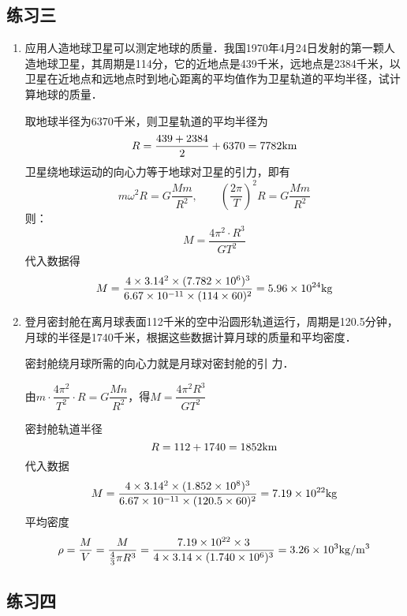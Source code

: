 \subsection{练习三}
\begin{enumerate}
	\item 应用人造地球卫星可以测定地球的质量．我国1970年4月24日发射的第一颗人造地球卫星，其周期是114分，它的近地点是439千米，远地点是2384千米，以卫星在近地点和远地点时到地心距离的平均值作为卫星轨道的平均半径，试计算地球的质量．

	\begin{solution}
		取地球半径为6370千米，则卫星轨道的平均半径为		
	\[R=\frac{439+2384}{2}+6370=7782{\rm km}\]
		卫星绕地球运动的向心力等于地球对卫星的引力，即有
\[m\omega^2 R=G\frac{Mm}{R^2},\qquad \left(\frac{2\pi}{T}\right)^2 R=G\frac{Mm}{R^2}\]
则：
\[M=\frac{4\pi^2\cdot R^3}{GT^2}\]
代入数据得
\[M=\frac{4\times 3.14^2\times (7.782\times 10^6)^3}{6.67\times 10^{-11}\times (114\times 60)^2}=5.96\times 10^{24}{\rm kg}\]
	\end{solution}
	
	\item 登月密封舱在离月球表面112千米的空中沿圆形轨道运行，周期是120.5分钟，月球的半径是1740千米，根据这些数据计算月球的质量和平均密度．

	\begin{solution}
密封舱绕月球所需的向心力就是月球对密封舱的引
力．

由$m\cdot \dfrac{4\pi^2}{T^2}\cdot R=G\dfrac{Mn}{R^2}$，得$M=\dfrac{4\pi^2 R^3}{GT^2}$

密封舱轨道半径
\[R=112+1740=1852{\rm km}\]
代入数据
\[M=\frac{4\times3.14^2\times(1.852\times10^8)^3}{6.67\times10^{-11}\times(120.5\times60)^2}
=7.19\times10^{22}{\rm kg}\]
平均密度
\[\rho=\frac{M}{V}=\frac{M}{\frac{4}{3}\pi R^3}=\frac{7.19\times 10^{22}\times 3}{4\times 3.14\times (1.740\times 10^{6})^3}=3.26\times 10^{3}{\rm kg/m^3}\]
	\end{solution}
	
\end{enumerate}


\subsection{练习四}

